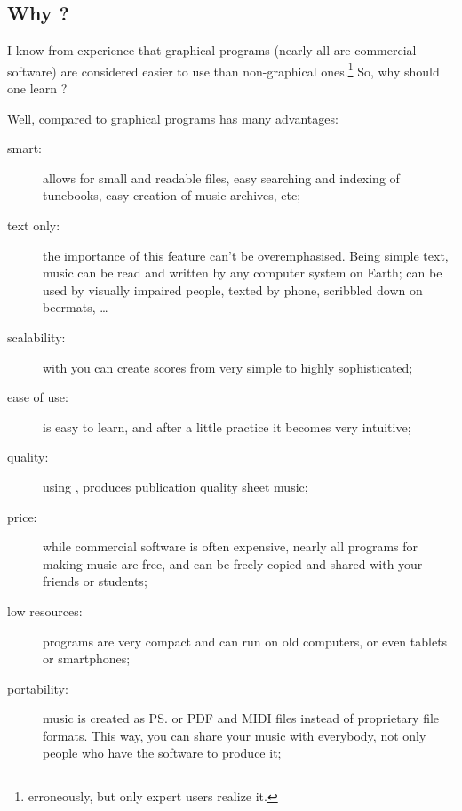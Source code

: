 \documentclass[a4paper,12pt]{book}
\begin{document}

\subsection{Why \ABC{}?}

I know from experience that graphical programs (nearly all are
commercial software) are considered easier to use than non-graphical
ones.\footnote{erroneously, but only expert users realize it.} So, why
should one learn \ABC?

Well, compared to graphical programs \ABC{} has many advantages:

\begin{description}
  
  \item [smart:] \ABC{} allows for small and readable files, ea\-sy
  se\-ar\-ching and indexing of tunebooks, easy creation of music
  archives, etc;
  
  \item [text only:] the importance of this feature can't be
  overemphasised. Being simple text, \ABC{} music can be read and
  written by any computer system on Earth; can be used by visually
  impaired people, texted by phone, scribbled down on beermats,
  {\ldots}
  
  \item [scalability:] with \ABC{} you can create scores from very
  simple to highly sophisticated;
  
  \item [ease of use:] \ABC{} is easy to learn, and after a little
  practice it becomes very intuitive;
  
  \item [quality:] using \abcm, \ABC{} produces publication quality
  sheet music;
  
  \item [price:] while commercial software is often expensive, nearly
  all programs for making \ABC{} music are free, and can be freely
  copied and shared with your friends or students;
  
  \item [low resources:] \ABC{} programs are very compact and can run
  on old computers, or even tablets or smartphones;
  
  \item [portability:] music is created as \ps{} or PDF and
  MIDI files instead of proprietary file formats. This way, you can
  share your music with everybody, not only people who have the
  software to produce it;
  

\end{description}
\end{document}
